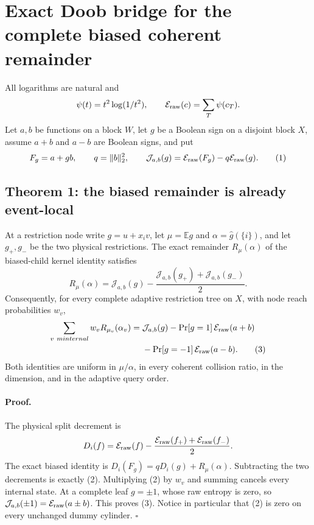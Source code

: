 \section*{Exact Doob bridge for the complete biased coherent remainder}

All logarithms are natural and
\[
 \psi(t)=t^2\log(1/t^2),\qquad
 \mathcal E_{\rm raw}(c)=\sum_T\psi(c_T).
\]
Let $a,b$ be functions on a block $W$, let $g$ be a Boolean sign on a
disjoint block $X$, assume $a+b$ and $a-b$ are Boolean signs, and put
\[
 F_g=a+gb,\qquad q=\|b\|_2^2,
 \qquad \mathcal J_{a,b}(g)=\mathcal E_{\rm raw}(F_g)
                         -q\mathcal E_{\rm raw}(g).                 \tag{1}
\]

\subsection*{Theorem 1: the biased remainder is already event-local}

At a restriction node write $g=u+x_i v$, let
$\mu=\mathbb Eg$ and $\alpha=\widehat g(\{i\})$, and let $g_+,g_-$ be
the two physical restrictions.  The exact remainder $R_\mu(\alpha)$ of
the biased-child kernel identity satisfies
\[
 \boxed{R_\mu(\alpha)=\mathcal J_{a,b}(g)
 -\frac{\mathcal J_{a,b}(g_+)+\mathcal J_{a,b}(g_-)}2.}             \tag{2}
\]
Consequently, for every complete adaptive restriction tree on $X$, with
node reach probabilities $w_v$,
\begin{align*}
 \sum_{v\ {
m internal}}w_vR_{\mu_v}(\alpha_v)
  ={}&\mathcal J_{a,b}(g)
    -\Pr[g=1]\,\mathcal E_{\rm raw}(a+b)\\
   &-\Pr[g=-1]\,\mathcal E_{\rm raw}(a-b).                         \tag{3}
\end{align*}
Both identities are uniform in $\mu/\alpha$, in every coherent collision
ratio, in the dimension, and in the adaptive query order.

\paragraph{Proof.}
The physical split decrement is
\[
 D_i(f)=\mathcal E_{\rm raw}(f)
       -\frac{\mathcal E_{\rm raw}(f_+)+
              \mathcal E_{\rm raw}(f_-)}2.
\]
The exact biased identity is
$D_i(F_g)=qD_i(g)+R_\mu(\alpha)$.  Subtracting the two decrements is
exactly (2).  Multiplying (2) by $w_v$ and summing cancels every internal
state.  At a complete leaf $g=\pm1$, whose raw entropy is zero, so
$\mathcal J_{a,b}(\pm1)=\mathcal E_{\rm raw}(a\pm b)$.  This proves
(3).  Notice in particular that (2) is zero on every unchanged dummy
cylinder. \(\square\)

